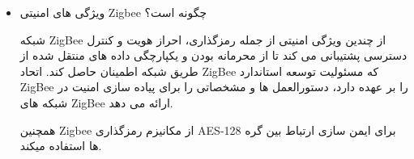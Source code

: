 \begin{itemize}
\item {
    ویژگی های امنیتی Zigbee چگونه است؟

    شبکه ZigBee از چندین ویژگی امنیتی از جمله رمزگذاری، احراز هویت و کنترل دسترسی پشتیبانی می کند تا از محرمانه بودن و یکپارچگی داده های منتقل شده از طریق شبکه اطمینان حاصل کند. اتحاد ZigBee که مسئولیت توسعه استاندارد ZigBee را بر عهده دارد، دستورالعمل ها و مشخصاتی را برای پیاده سازی امنیت در شبکه های ZigBee ارائه می دهد.

    همچنین Zigbee از 
    مکانیزم رمزگذاری AES-128 برای ایمن سازی ارتباط بین گره ها
    استفاده میکند.

}


\end{itemize}








